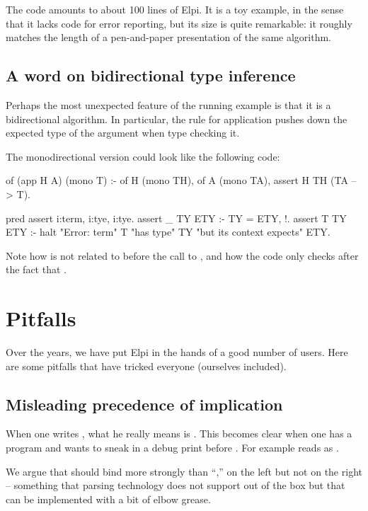 \documentclass{these-ISSS}
\newenvironment{elpicode}
  {\VerbatimEnvironment\begin{elpibox}\begin{xelpicode}}{\end{xelpicode}
\end{elpibox}}
\begin{document}
The code amounts to about 100 lines of Elpi. It is a toy example, in the sense
that it lacks code for error reporting, but its size is quite remarkable: it
roughly matches the length of a pen-and-paper presentation of the same
algorithm.

\subsection{A word on bidirectional type inference}

Perhaps the most unexpected feature of the running example is that it is a
bidirectional algorithm. In particular, the rule for application pushes down
the expected type of the argument when type checking it.

The monodirectional version could look like the following code:

\begin{elpicode}
of (app H A) (mono T) :-
  of H (mono TH),
  of A (mono TA),
  assert H TH (TA --> T).

pred assert i:term, i:tye, i:tye.
assert _ TY ETY :- TY = ETY, !.
assert T TY ETY :-
  halt "Error: term" T "has type" TY "but its context expects" ETY.
\end{elpicode}

\noindent
Note how  is not related to  before the call to
, and how the code only checks after the fact that
.

\newpage
\section{Pitfalls}

Over the years, we have put Elpi in the hands of a good number of users. Here
are some pitfalls that have tricked everyone (ourselves included).

\subsection{Misleading precedence of implication}

When one writes , what he really means is .
This becomes clear when one has a program  and wants to sneak in
a debug print before . For example  reads as
.

We argue that \elpi{=>} should bind more strongly than ``,'' on the left but
not on the right -- something that parsing technology does not support out of the
box but that can be implemented with a bit of elbow grease. 
\end{document}
